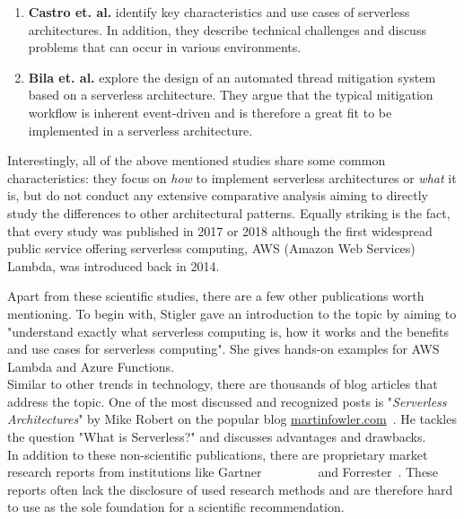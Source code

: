 \begin{enumerate}
    \item 
        \textbf{Castro et. al.} identify key characteristics and use cases of serverless architectures. In addition, they describe technical challenges and discuss problems that can occur in various environments.
    \item
        \textbf{Bila et. al.} explore the design of an automated thread mitigation system based on a serverless architecture. They argue that the typical mitigation workflow is inherent event-driven and is therefore a great fit to be implemented in a serverless architecture.  ~
\end{enumerate}

Interestingly, all of the above mentioned studies share some common characteristics: they focus on \textit{how} to implement serverless architectures or \textit{what} it is, but do not conduct any extensive comparative analysis aiming to directly study the differences to other architectural patterns. Equally striking is the fact, that every study was published in 2017 or 2018 although the first widespread public service offering serverless computing, AWS (Amazon Web Services) Lambda, was introduced back in 2014.~

Apart from these scientific studies, there are a few other publications worth mentioning. To begin with, Stigler gave an introduction to the topic by aiming to "understand exactly what serverless computing is, how it works and the benefits and use cases for serverless computing". She gives hands-on examples for AWS Lambda and Azure Functions.~\\
Similar to other trends in technology, there are thousands of blog articles that address the topic. One of the most discussed and recognized posts is "\textit{Serverless Architectures}" by Mike Robert on the popular blog \url{martinfowler.com}~. He tackles the question "What is Serverless?" and discusses advantages and drawbacks. \\
In addition to these non-scientific publications, there are proprietary market research reports from institutions like Gartner
~\highcomma
~\highcomma
~\highcomma
~\highcomma
~
and Forrester~. These reports often lack the disclosure of used research methods and are therefore hard to use as the sole foundation for a scientific recommendation. 

